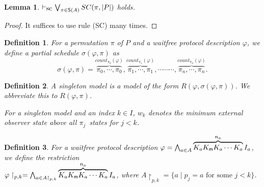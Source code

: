\documentclass[doctor]{iscs-thesis}
\newcommand{\vdashsc}{\vdash_{\mbox{\rm sc}}}
\newcommand{\memory}{{\sf m}}
\newtheorem{definition}{Definition}
\newtheorem{lemma}{Lemma}
\begin{document}
\begin{lemma}
 \label{perm}
 $\vdashsc \bigvee_{\pi\in \mathsf S(A)} SC(\pi, |P|)$ holds.
\end{lemma}
\begin{proof}
 It suffices to use rule (SC) many times.
\end{proof}

\begin{definition}
 For a permutation $\pi$ of $P$ and a waitfree protocol description $\varphi$, we
 define a partial schedule $\sigma(\varphi, \pi)$ as
\[
 \sigma(\varphi, \pi) = 
 \overbrace{\pi_0, \cdots, \pi_0}^{count_{\pi_0}(\varphi)},
 \overbrace{\pi_1, \cdots, \pi_1}^{count_{\pi_1}(\varphi)},
 \cdots \cdots
 \cdots,
 \overbrace{\pi_n,\cdots, \pi_n}^{count_{\pi_n}(\varphi)}.
\]
\end{definition}

\begin{definition}
 A singleton model is a model of the form $R(\varphi, \sigma(\varphi,
 \pi))$. We abbreviate this to $R(\varphi, \pi)$.

 For a singleton model and an index $k\in I$, $w_k$ denotes the minimum external
 observer state above all $\pi_j$~states for $j< k$.
\end{definition}

\begin{definition}
 For a waitfree protocol description $\varphi = \bigwedge_{a\in A} 
 \overbrace{K_a K_\memory K_a \cdots K_a}^{n_a}
 I_a$, we define the restriction \\
 $\varphi\restriction_{p,k} = 
 \bigwedge_{a\in A\restriction_{p,k}} \overbrace{K_a K_\memory K_a \cdots K_a}^{n_a} I_a$,
 where $A\restriction_{p,k} = \{a\mid p_j = a \mbox{ for some
 } j<
 k\}$.
\end{definition}
\end{document}
